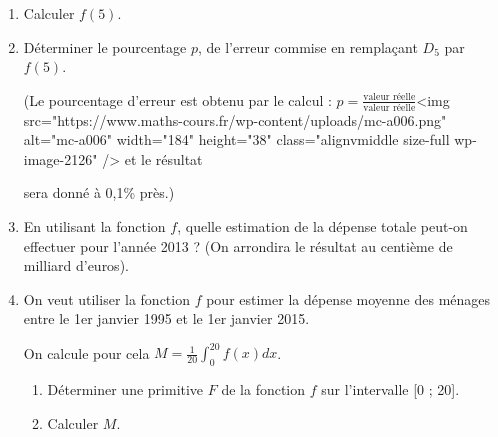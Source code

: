 \begin{enumerate}
     \item
     Calculer $f\left(5\right)$.
     \item
     Déterminer le pourcentage $p$, de l'erreur commise en remplaçant $D_{5}$ par $f\left(5\right)$.
     \par
     (Le pourcentage d'erreur est obtenu par le calcul : $p=$\nosp$\frac{\text{valeur réelle}}{\text{valeur réelle}}$<img src="https://www.maths-cours.fr/wp-content/uploads/mc-a006.png" alt="mc-a006" width="184" height="38" class="alignvmiddle size-full wp-image-2126" />	et le résultat
     \par
     sera donné à 0,1\% près.)
     \item
     En utilisant la fonction $f$, quelle estimation de la dépense totale peut-on effectuer pour l'année 2013 ? (On arrondira le résultat au centième de milliard d'euros).
     \item
     On veut utiliser la fonction $f$ pour estimer la dépense moyenne des ménages entre le 1er janvier 1995 et le 1er janvier 2015.
     \par
     On calcule pour cela $M=\frac{1}{20} \int_{0}^{20} f\left(x\right)dx$.
     \begin{enumerate}[label=\alph*.]
          \item
          Déterminer une primitive $F$ de la fonction $f$ sur l'intervalle [0 ; 20].
          \item
     Calculer $M$.\end{enumerate}
\end{enumerate}
